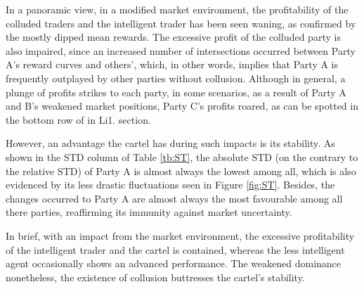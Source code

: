 \documentclass[11pt,twoside]{article}
\numberwithin{Theorem}{section}
\numberwithin{Definition}{section}
\numberwithin{Lemma}{section}
\numberwithin{Algorithm}{section}
\numberwithin{equation}{section}
\begin{document}
In a panoramic view, in a modified market environment, the profitability of the colluded traders and the intelligent trader has been seen waning, as confirmed by the mostly dipped mean rewards. The excessive profit of the colluded party is also impaired, since an increased number of intersections occurred between Party A's reward curves and others', which, in other words, implies that Party A is frequently outplayed by other parties without collusion. Although in general, a plunge of profits strikes to each party, in some scenarios, as a result of Party A and B's weakened market positions, Party C's profits roared, as can be spotted in the bottom row of in Li1. section. 

However, an advantage the cartel has during such impacts is its stability. As shown in the STD column of Table \ref{tb:ST}, the absolute STD (on the contrary to the relative STD) of Party A is almost always the lowest among all, which is also evidenced by its less drastic fluctuations seen in Figure \ref{fig:ST}. Besides, the changes occurred to Party A are almost always the most favourable among all there parties, reaffirming its immunity against market uncertainty.

In brief, with an impact from the market environment, the excessive profitability of the intelligent trader and the cartel is contained, whereas the less intelligent agent occasionally shows an advanced performance. The weakened dominance nonetheless, the existence of collusion buttresses the cartel's stability.
\end{document}
